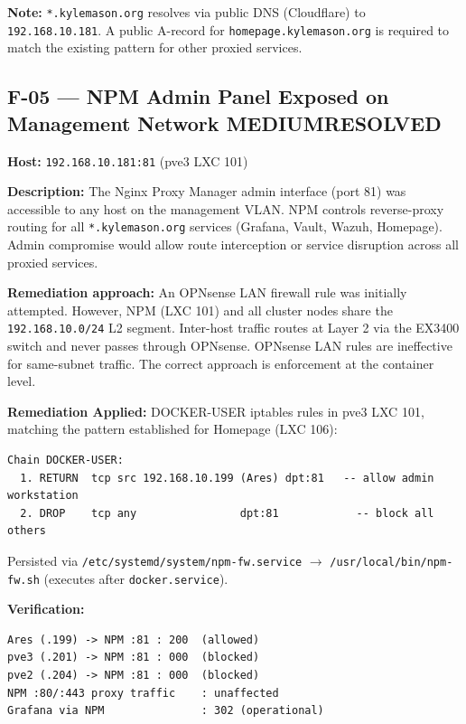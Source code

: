 \documentclass[11pt,a4paper]{article}
\newcommand{\medium}{\colorbox{medium}{\color{white}\small\textbf{MEDIUM}}}
\newcommand{\resolved}{\colorbox{resolved}{\color{white}\small\textbf{RESOLVED}}}
\begin{document}
\textbf{Note:} \texttt{*.kylemason.org} resolves via public DNS (Cloudflare) to
\texttt{192.168.10.181}. A public A-record for \texttt{homepage.kylemason.org} is required
to match the existing pattern for other proxied services.

\subsection{F-05 — NPM Admin Panel Exposed on Management Network \quad \medium \quad \resolved}

\textbf{Host:} \texttt{192.168.10.181:81} (pve3 LXC 101)

\textbf{Description:} The Nginx Proxy Manager admin interface (port 81) was accessible to
any host on the management VLAN. NPM controls reverse-proxy routing for all
\texttt{*.kylemason.org} services (Grafana, Vault, Wazuh, Homepage). Admin compromise would
allow route interception or service disruption across all proxied services.

\textbf{Remediation approach:} An OPNsense LAN firewall rule was initially attempted.
However, NPM (LXC 101) and all cluster nodes share the \texttt{192.168.10.0/24} L2 segment.
Inter-host traffic routes at Layer 2 via the EX3400 switch and never passes through
OPNsense. OPNsense LAN rules are ineffective for same-subnet traffic. The correct approach
is enforcement at the container level.

\textbf{Remediation Applied:} DOCKER-USER iptables rules in pve3 LXC 101, matching the
pattern established for Homepage (LXC 106):

\begin{lstlisting}
Chain DOCKER-USER:
  1. RETURN  tcp src 192.168.10.199 (Ares) dpt:81   -- allow admin workstation
  2. DROP    tcp any                dpt:81            -- block all others
\end{lstlisting}

Persisted via \texttt{/etc/systemd/system/npm-fw.service} $\to$
\texttt{/usr/local/bin/npm-fw.sh} (executes after \texttt{docker.service}).

\textbf{Verification:}
\begin{lstlisting}
Ares (.199) -> NPM :81 : 200  (allowed)
pve3 (.201) -> NPM :81 : 000  (blocked)
pve2 (.204) -> NPM :81 : 000  (blocked)
NPM :80/:443 proxy traffic    : unaffected
Grafana via NPM               : 302 (operational)
\end{lstlisting}
\end{document}
